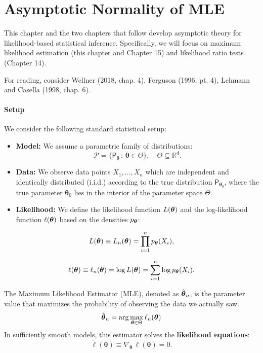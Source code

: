 \chapter{Asymptotic Normality of MLE}
\label{cha:Asymptotic Normality of MLE}

This chapter and the two chapters that follow develop asymptotic theory for likelihood-based statistical inference. Specifically, we will focus on maximum likelihood estimation (this chapter and Chapter 15) and likelihood ratio tests (Chapter 14).

For reading, consider Wellner (2018, chap. 4), Ferguson (1996, pt. 4), Lehmann
and Casella (1998, chap. 6).


\subsubsection{Setup}
\label{setup-3}

We consider the following standard statistical setup:
\begin{itemize}
	\item \textbf{Model:} We assume a parametric family of distributions:
	      \[ \mathcal{P} = \{ \mathsf{P}_{\boldsymbol{\theta}} \, : \, \boldsymbol{\theta} \in \Theta \}, \quad \Theta \subseteq \mathbb{R}^d. \]
	\item \textbf{Data:} We observe data points \(X_1, \dots, X_n\) which are independent and identically distributed (i.i.d.) according to the true distribution \(\mathsf{P}_{\boldsymbol{\theta}_0}\), where the true parameter \(\boldsymbol{\theta}_0\) lies in the interior of the parameter space \(\Theta\).
	\item \textbf{Likelihood:} We define the likelihood function \(L(\boldsymbol{\theta})\) and the log-likelihood function \(\ell(\boldsymbol{\theta})\) based on the densities \(p_{\boldsymbol{\theta}}\):
\end{itemize}

\[ L(\boldsymbol{\theta}) \equiv L_n(\boldsymbol{\theta}) = \prod_{i=1}^n p_{\boldsymbol{\theta}}(X_i), \]

\[ \ell(\boldsymbol{\theta}) \equiv \ell_n(\boldsymbol{\theta}) = \log L(\boldsymbol{\theta}) = \sum\limits_{i=1}^n \log p_{\boldsymbol{\theta}}(X_i). \]

The Maximum Likelihood Estimator (MLE), denoted as \(\hat{\boldsymbol{\theta}}_n\), is the parameter value that maximizes the probability of observing the data we actually saw.
\[ \hat{\boldsymbol{\theta}}_n = \arg\max_{\boldsymbol{\theta} \in \Theta} \ell_n(\boldsymbol{\theta}) \]
In sufficiently smooth models, this estimator solves the \textbf{likelihood equations}:
\[ \dot{\ell}(\boldsymbol{\theta}) \equiv \nabla_{\boldsymbol{\theta}} \, \ell(\boldsymbol{\theta}) = 0. \]

